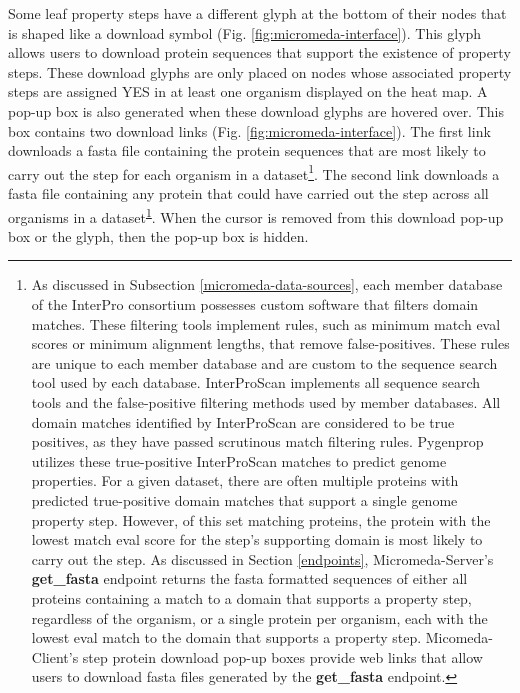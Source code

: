 \FloatBarrier
Some leaf property steps have a different glyph at the bottom of their nodes 
that is shaped like a download symbol (Fig. \ref{fig:micromeda-interface}). This 
glyph allows users to download protein sequences that support the existence of 
property steps. These download glyphs are only placed on nodes whose associated 
property steps are assigned YES in at least one organism displayed on the heat 
map. A pop-up box is also generated when these download glyphs are hovered over. 
This box contains two download links (Fig. \ref{fig:micromeda-interface}). The 
first link downloads a \gls{fasta} file containing the protein sequences that 
are most likely to carry out the step for each organism in a dataset\footnote{As 
discussed in Subsection \ref{micromeda-data-sources}, each member 
database of the InterPro consortium possesses custom software that filters 
domain matches. These filtering tools implement rules, such as minimum match 
\gls{eval} scores or minimum alignment lengths, that remove false-positives. 
These rules are unique to each member database and are custom to the sequence 
search tool used by each database. InterProScan implements all sequence search 
tools and the false-positive filtering methods used by member databases. All 
domain matches identified by InterProScan are considered to be true positives, 
as they have passed scrutinous match filtering rules. Pygenprop utilizes these 
true-positive InterProScan matches to predict genome properties. For a given 
dataset, there are often multiple proteins with predicted true-positive domain 
matches that support a single genome property step. However, of this set 
matching proteins, the protein with the lowest match \gls{eval} score for the 
step’s supporting domain is most likely to carry out the step. As discussed in 
Section \ref{endpoints}, Micromeda-Server’s \textbf{get\_fasta} 
endpoint returns the \gls{fasta} formatted sequences of either all proteins 
containing a match to a domain that supports a property step, regardless of the 
organism, or a single protein per organism, each with the lowest \gls{eval} 
match to the domain that supports a property step. Micomeda-Client’s step 
protein download pop-up boxes provide web links that allow users to download 
\gls{fasta} files generated by the \textbf{get\_fasta} 
endpoint.\label{protein-download-note}}. The second link downloads a \gls{fasta} 
file containing any protein that could have carried out the step across all 
organisms in a dataset\textsuperscript{\ref{protein-download-note}}. When the 
cursor is removed from this download pop-up box or the glyph, then the pop-up 
box is hidden.

